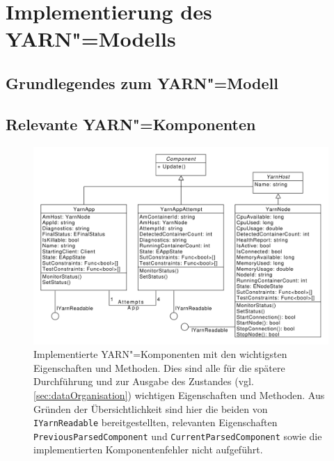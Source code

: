 \section{Implementierung des \acs{YARN}"=Modells}
\label{sec:yarnModel}



\subsection{Grundlegendes zum \acs{YARN}"=Modell}
\label{sec:yarnModelBasics}

\subsection{Relevante \acs{YARN}"=Komponenten}
\label{sec:yarnComponents}

\begin{figure}[h]
    \includegraphics[width=\columnwidth]{./images/yarnComponents.pdf}
    \caption[Implementierte \ac{YARN}"=Komponenten mit den wichtigsten Eigenschaften und Methoden]
        {Implementierte \ac{YARN}"=Komponenten mit den wichtigsten Eigenschaften und Methoden.
        Dies sind alle für die spätere Durchführung und zur Ausgabe des Zustandes (vgl. \autoref{sec:dataOrganisation}) wichtigen Eigenschaften und Methoden.
        Aus Gründen der Übersichtlichkeit sind hier die beiden von \texttt{IYarnReadable} bereitgestellten, relevanten Eigenschaften \texttt{PreviousParsedComponent} und \texttt{CurrentParsedComponent} sowie die implementierten Komponentenfehler nicht aufgeführt.}
    \label{fig:yarnComponentsClassDiagram}
\end{figure}

